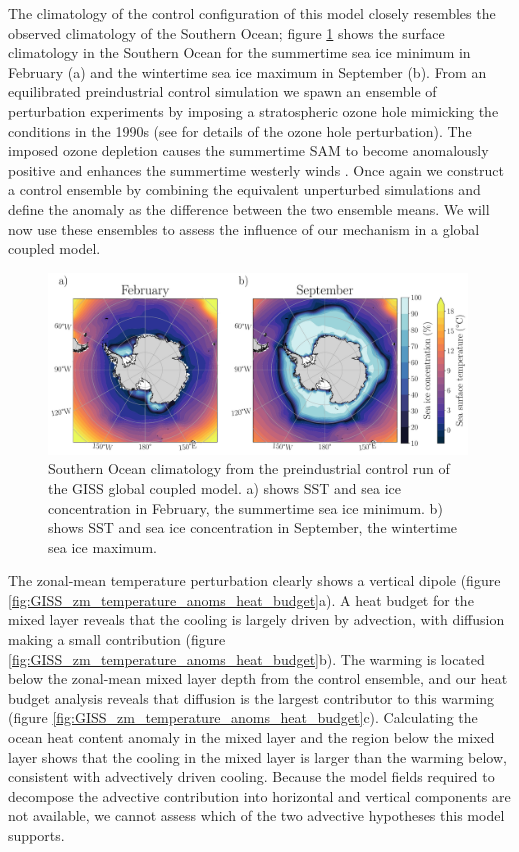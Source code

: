 \documentclass{ametsocV5}
\begin{document}
The climatology of the control configuration of this model closely resembles the observed climatology of the Southern Ocean; figure \ref{fig:GISS_overview} shows the surface climatology in the Southern Ocean for the summertime sea ice minimum in February (a) and the wintertime sea ice maximum in September (b). From an equilibrated preindustrial control simulation we spawn an ensemble of perturbation experiments by imposing a stratospheric ozone hole mimicking the conditions in the 1990s (see \citet{Doddridge2019a} for details of the ozone hole perturbation). The imposed ozone depletion causes the summertime SAM to become anomalously positive and enhances the summertime westerly winds \citep{Polvani2011}. Once again we construct a control ensemble by combining the equivalent unperturbed simulations and define the anomaly as the difference between the two ensemble means. We will now use these ensembles to assess the influence of our mechanism in a global coupled model.






\begin{figure}[!ht]
    \begin{center}
        \includegraphics[width=0.99\textwidth]{figures/GISS_overview.pdf}
        \caption{Southern Ocean climatology from the preindustrial control run of the GISS global coupled model. a) shows SST and sea ice concentration in February, the summertime sea ice minimum. b) shows SST and sea ice concentration in September, the wintertime sea ice maximum.}
        \label{fig:GISS_overview}
    \end{center}
\end{figure}


The zonal-mean temperature perturbation clearly shows a vertical dipole (figure \ref{fig:GISS_zm_temperature_anoms_heat_budget}a). A heat budget for the mixed layer reveals that the cooling is largely driven by advection, with diffusion making a small contribution (figure \ref{fig:GISS_zm_temperature_anoms_heat_budget}b). The warming is located below the zonal-mean mixed layer depth from the control ensemble, and our heat budget analysis reveals that diffusion is the largest contributor to this warming (figure \ref{fig:GISS_zm_temperature_anoms_heat_budget}c). Calculating the ocean heat content anomaly in the mixed layer and the region below the mixed layer shows that the cooling in the mixed layer is larger than the warming below, consistent with advectively driven cooling. Because the model fields required to decompose the advective contribution into horizontal and vertical components are not available, we cannot assess which of the two advective hypotheses this model supports.
\end{document}
